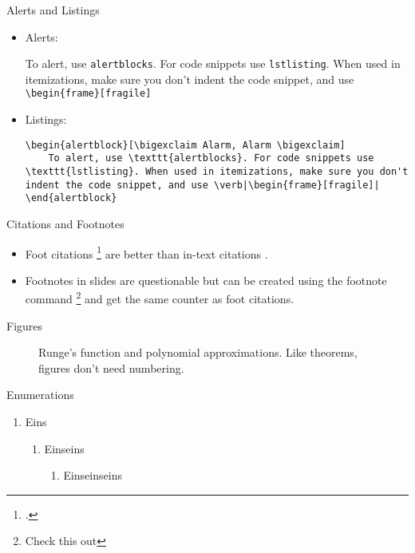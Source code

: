 \documentclass{beamer}
\begin{document}
\begin{frame}[fragile]{Alerts and Listings}
\begin{itemize}
	\item Alerts:
	\begin{alertblock}
		To alert, use \texttt{alertblocks}. For code snippets use \texttt{lstlisting}. When used in itemizations, make sure you don't indent the code snippet, and use \verb|\begin{frame}[fragile]|
	\end{alertblock}
\item Listings:
	\begin{lstlisting}
\begin{alertblock}[\bigexclaim Alarm, Alarm \bigexclaim]
	To alert, use \texttt{alertblocks}. For code snippets use \texttt{lstlisting}. When used in itemizations, make sure you don't indent the code snippet, and use \verb|\begin{frame}[fragile]|
\end{alertblock}
	\end{lstlisting}
\end{itemize}
\end{frame}

\begin{frame}{Citations and Footnotes}
\begin{itemize}
	\item Foot citations \footcite{AdamsFournier2003} are better than in-text citations \citep{AlexanderianPetraStadlerEtAl2016}.

	\item Footnotes in slides are questionable but can be created using the footnote command \footnote{Check this out} and get the same counter as foot citations.
\end{itemize}
\end{frame}
	
\begin{frame}{Figures}
\begin{figure}
	\scalebox{0.6}{}
	\caption{Runge's function and polynomial approximations. Like theorems, figures don't need numbering.}
\end{figure}
\end{frame}

\begin{frame}{Enumerations}
\begin{enumerate}
	\item Eins
	\begin{enumerate}
		\item Einseins
		\begin{enumerate}
			\item Einseinseins
		\end{enumerate}
	\end{enumerate}
\end{enumerate}
\end{frame}
\end{document}
